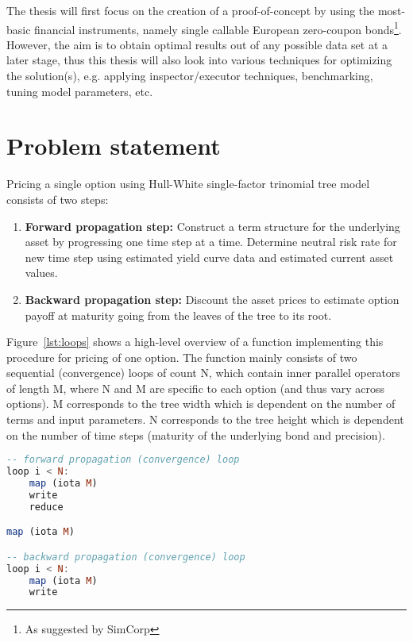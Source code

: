 The thesis will first focus on the creation of a proof-of-concept by using the most-basic financial instruments, namely single callable European zero-coupon bonds\footnote{As suggested by SimCorp}. However, the aim is to obtain optimal results out of any possible data set at a later stage, thus this thesis will also look into various techniques for optimizing the solution(s), e.g. applying inspector/executor techniques, benchmarking, tuning model parameters, etc. 

\section{Problem statement}
Pricing a single option using Hull-White single-factor trinomial tree model consists of two steps:
\begin{enumerate}
    \item \textbf{Forward propagation step:} Construct a term structure for the underlying asset by progressing one time step at a time. Determine neutral risk rate for new time step using estimated yield curve data and estimated current asset values.
    \item \textbf{Backward propagation step:} Discount the asset prices to estimate option payoff at maturity going from the leaves of the tree to its root. 
\end{enumerate}

Figure~\ref{lst:loops} shows a high-level overview of a function implementing this procedure for pricing of one option. The function mainly consists of two sequential (convergence) loops of count N, which contain inner parallel operators of length M, where N and M are specific to each option (and thus vary across options). M corresponds to the tree width which is dependent on the number of terms and input parameters. N corresponds to the tree height which is dependent on the number of time steps (maturity of the underlying bond and precision).
\clearpage
\begin{lstlisting}[caption={High-level view of pricing a single option using Hull-White 1F model},label={lst:loops},language=Haskell,frame=lines]
-- forward propagation (convergence) loop
loop i < N:
    map (iota M)
    write
    reduce

map (iota M)

-- backward propagation (convergence) loop
loop i < N:
    map (iota M)
    write
\end{lstlisting}

